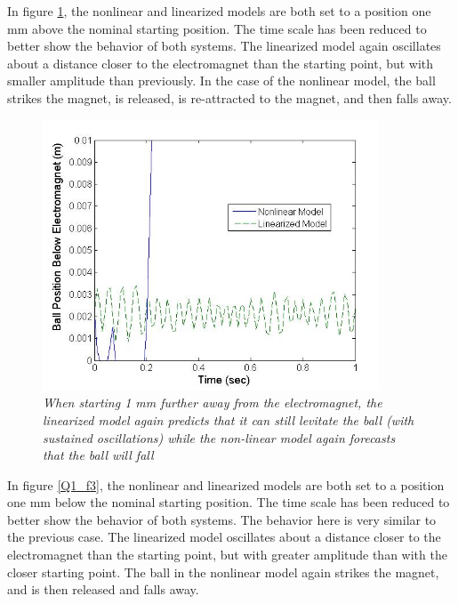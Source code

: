 \documentclass{article}
\theoremstyle{plain}
\theoremstyle{definition}
\theoremstyle{remark}
\begin{document}
In figure \ref{Q1_f2}, the nonlinear and linearized models are both set to a position one mm above the nominal starting position. The time scale has been reduced to better show the behavior of both systems. The linearized model again oscillates about a distance closer to the electromagnet than the starting point, but with smaller amplitude than previously. In the case of the nonlinear model, the ball strikes the magnet, is released, is re-attracted to the magnet, and then falls away.\\

\begin{figure}
\begin{center}
\includegraphics[width = 10cm]{Part1fCloseDisturbance}
\caption{\emph{When starting 1 mm further away from the electromagnet, the linearized model again predicts that it can still levitate the ball (with sustained oscillations) while the non-linear model again forecasts that the ball will fall}}
\label{Q1_f2}
\end{center}
\end{figure}

In figure \ref{Q1_f3}, the nonlinear and linearized models are both set to a position one mm below the nominal starting position. The time scale has been reduced to better show the behavior of both systems. The behavior here is very similar to the previous case. The linearized model oscillates about a distance closer to the electromagnet than the starting point, but with greater amplitude than with the closer starting point. The ball in the nonlinear model again strikes the magnet, and is then released and falls away.  
\end{document}
